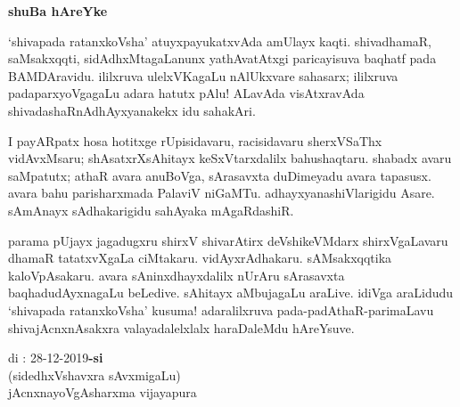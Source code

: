 \begin{center}
{\Huge\bfseries shuBa hAreYke}
\end{center}

\bigskip

`shivapada ratanxkoVsha' atuyxpayukatxvAda amUlayx kaqti. shivadhamaR, saMsakxqqti, sidAdhxMtagaLanunx yathAvatAtxgi paricayisuva baqhatf pada BAMDAravidu. ililxruva ulelxVKagaLu nAlUkxvare sahasarx; ililxruva padaparxyoVgagaLu adara hatutx pAlu! ALavAda visAtxravAda shivadashaRnAdhAyxyanakekx idu sahakAri.

\medskip

I payARpatx hosa hotitxge rUpisidavaru, racisidavaru sherxVSaThx vidAvxMsaru; shAsatxrXsAhitayx keSxVtarxdalilx bahushaqtaru. shabadx avaru saMpatutx; athaR avara anuBoVga, sArasavxta duDimeyadu avara tapasusx. avara bahu parisharxmada PalaviV niGaMTu. adhayxyana\-shiVlarigidu Asare. sAmAnayx sAdhakarigidu sahAyaka mAgaRdashiR.

\medskip

parama pUjayx jagadugxru shirxV shivarAtirx deVshikeVMdarx shirxVgaLavaru dhamaR tatatxvXgaLa ciMtakaru. vidAyxrAdhakaru. sAMsakxqqtika kaloVpAsakaru. avara sAninxdhayxdalilx nUrAru sArasavxta baqhadudAyxnagaLu beLedive. sAhitayx aMbujagaLu araLive. idiVga araLidudu `shivapada ratanxkoVsha' kusuma! adaralilxruva pada-padAthaR-parimaLavu shivajAcnxnAsakxra valayadalelxlalx haraDaleMdu hAreYsuve.

\vskip 1.5cm

\noindent
di : 28-12-2019\hfill {\bf -si}\hspace{1.7cm}\,\\
\phantom{aa}\hfill (sidedhxVshavxra sAvxmigaLu)\quad\,\\
\phantom{a} \hfill jAcnxnayoVgAsharxma vijayapura
